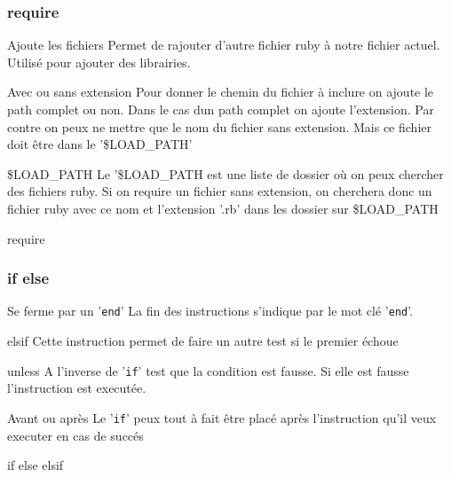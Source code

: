 \documentclass{beamer}
\begin{document}
\begin{frame}
  \frametitle{require}
  \begin{block}{Ajoute les fichiers}
    Permet de rajouter d'autre fichier ruby à notre fichier actuel. Utilis\'e pour ajouter des librairies.
  \end{block}
  \begin{block}{Avec ou sans extension}
    Pour donner le chemin du fichier à inclure on ajoute le path complet ou non. Dans le cas dun path complet on ajoute l'extension. Par contre on peux ne mettre que le nom du fichier sans extension. Mais ce fichier doit être dans le '\$LOAD\_PATH'
  \end{block}
  \begin{block}{\$LOAD\_PATH}
    Le '\$LOAD\_PATH est une liste de dossier où on peux chercher des fichiers ruby. Si on require un fichier sans extension, on cherchera donc un fichier ruby avec ce nom et l'extension '.rb' dans les dossier sur \$LOAD\_PATH
  \end{block}
\end{frame}

\begin{frame}
  \begin{beamerboxesrounded}{require}
    
  \end{beamerboxesrounded}
\end{frame}


\begin{frame}
  \frametitle{if else}
  \begin{block}{Se ferme par un '\verb?end?'}
    La fin des instructions s'indique par le mot cl\'e '\verb?end?'.
  \end{block}
  \begin{block}{elsif}
    Cette instruction permet de faire un autre test si le premier \'echoue
  \end{block}
  \begin{block}{unless}
    A l'inverse de '\verb?if?' test que la condition est fausse. Si elle est fausse l'instruction est execut\'ee.
  \end{block}
  \begin{block}{Avant ou après}
      Le '\verb?if?' peux tout à fait être plac\'e après l'instruction qu'il veux executer en cas de succ\'es
  \end{block}
\end{frame}

\begin{frame}
  \begin{beamerboxesrounded}{if else elsif}
    
  \end{beamerboxesrounded}
\end{frame}
\end{document}

